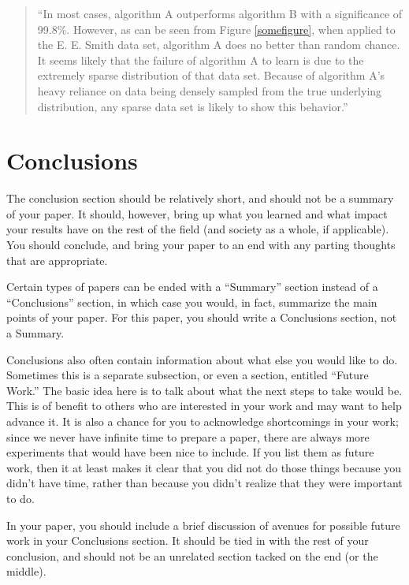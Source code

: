 \documentclass[12pt,letterpaper]{article}
\begin{document}
\begin{quote}
``In most cases, algorithm A outperforms algorithm B with a significance of
99.8\%.  However, as can be seen from Figure \ref{somefigure}, when applied to
the E. E. Smith data set, algorithm A does no better than random chance.  It
seems likely that the failure of algorithm A to learn is due to the extremely
sparse distribution of that data set.  Because of algorithm A's heavy reliance
on data being densely sampled from the true underlying distribution, any sparse
data set is likely to show this behavior.''
\end{quote}

\section{Conclusions}
The conclusion section should be relatively short, and should not be a summary
of your paper.  It should, however, bring up what you learned and what impact
your results have on the rest of the field (and society as a
whole, if applicable).  You should conclude, and bring your paper to an  end
with any parting thoughts that are appropriate.

Certain types of papers can be ended with a ``Summary'' section instead of a
``Conclusions'' section, in which case you would, in fact, summarize the main
points of your paper.  For this paper, you should write a Conclusions section,
not a Summary.

Conclusions also often contain information about what else you would like
to do.  Sometimes this is a separate subsection, or even a section, entitled
``Future Work.''  The basic idea here is to talk about what the next steps to
take would be.  This is of benefit to others who are interested in your
work and may want to help advance it.  It is also a chance for you to
acknowledge shortcomings in your work; since we never have infinite time to
prepare a paper, there are always more experiments that would have been nice to
include.  If you list them as future work, then it at least makes it clear that
you did not do those things because you didn't have time, rather than because you
didn't realize that they were important to do.

In your paper, you should include a brief discussion of avenues for possible
future work in your Conclusions section.  It should be tied in with the rest of
your conclusion, and should not be an unrelated section tacked on the end (or
the middle).



\end{document}
